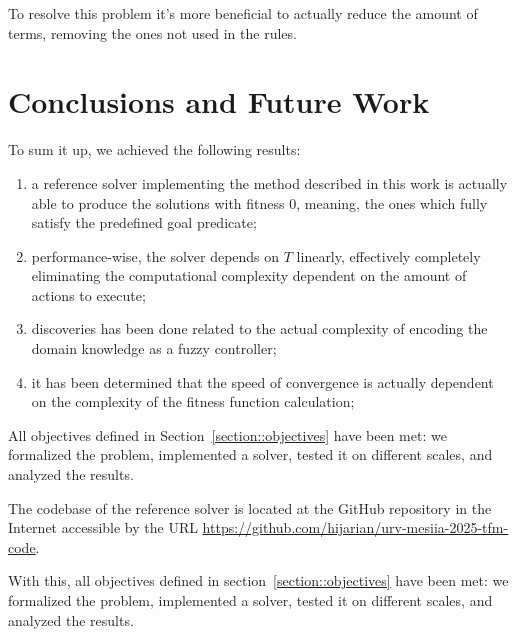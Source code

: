\documentclass[12pt, a4paper]{report}
\begin{document}
	To resolve this problem it's more beneficial to actually reduce the amount of terms, removing the ones not used in the rules.
	


	
	\chapter{Conclusions and Future Work}\label{section::conclusions}

	To sum it up, we achieved the following results:
	
	\begin{enumerate}
		\item a reference solver implementing the method described in this work is actually able to produce the solutions with fitness 0, meaning, the ones which fully satisfy the predefined goal predicate;
		\item performance-wise, the solver depends on $T$ linearly, effectively completely eliminating the computational complexity dependent on the amount of actions to execute;
		\item discoveries has been done related to the actual complexity of encoding the domain knowledge as a fuzzy controller;
		\item it has been determined that the speed of convergence is actually dependent on the complexity of the fitness function calculation;
	\end{enumerate}
	
	All objectives defined in Section~\ref{section::objectives} have been met: we formalized the problem, implemented a solver, tested it on different scales, and analyzed the results.
		
	The codebase of the reference solver is located at the GitHub repository in the Internet accessible by the URL \url{https://github.com/hijarian/urv-mesiia-2025-tfm-code}.
	
	With this, all objectives defined in section~\ref{section::objectives} have been met: we formalized the problem, implemented a solver, tested it on different scales, and analyzed the results.
	
\end{document}
